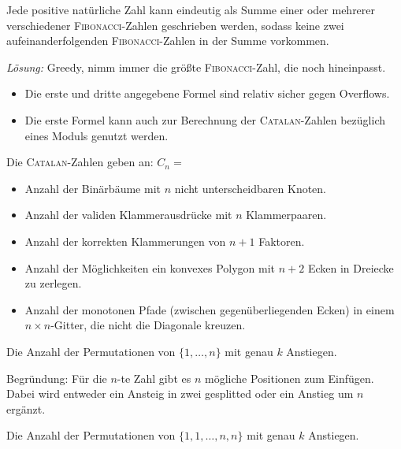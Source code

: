 \begin{bem}\label{bem:fibonacciGreedy}
	Jede positive natürliche Zahl kann eindeutig als Summe einer oder mehrerer
	verschiedener \textsc{Fibonacci}-Zahlen geschrieben werden, sodass keine zwei
	aufeinanderfolgenden \textsc{Fibonacci}-Zahlen in der Summe vorkommen.

	\emph{Lösung:} Greedy, nimm immer die größte \textsc{Fibonacci}-Zahl, die noch
	hineinpasst.
\end{bem}

\begin{bem}\label{bem:catalanOverflow}
	\begin{itemize}
		\item Die erste und dritte angegebene Formel sind relativ sicher gegen Overflows.
		\item Die erste Formel kann auch zur Berechnung der \textsc{Catalan}-Zahlen
		bezüglich eines Moduls genutzt werden.
	\end{itemize}
\end{bem}

\begin{bem}\label{bem:catalanAnwendung}
	Die \textsc{Catalan}-Zahlen geben an: $C_n =$
	\begin{itemize}
		\item Anzahl der Binärbäume mit $n$ nicht unterscheidbaren Knoten.
		\item Anzahl der validen Klammerausdrücke mit $n$ Klammerpaaren.
		\item Anzahl der korrekten Klammerungen von $n+1$ Faktoren.
		\item Anzahl der Möglichkeiten ein konvexes Polygon mit $n + 2$ Ecken in
		Dreiecke zu zerlegen.
		\item Anzahl der monotonen Pfade (zwischen gegenüberliegenden Ecken) in
		einem $n \times n$-Gitter, die nicht die Diagonale kreuzen.
	\end{itemize}
\end{bem}

\begin{bem}\label{bem:euler1}
	Die Anzahl der Permutationen von $\{1, \ldots, n\}$ mit genau $k$ Anstiegen.

	Begründung: Für die $n$-te Zahl gibt es $n$ mögliche Positionen zum Einfügen.
	Dabei wird entweder ein Ansteig in zwei gesplitted oder ein Anstieg um $n$ ergänzt.
	\end{bem}

\begin{bem}\label{bem:euler2}
	Die Anzahl der Permutationen von $\{1,1, \ldots, n,n\}$ mit genau $k$ Anstiegen.
\end{bem}

